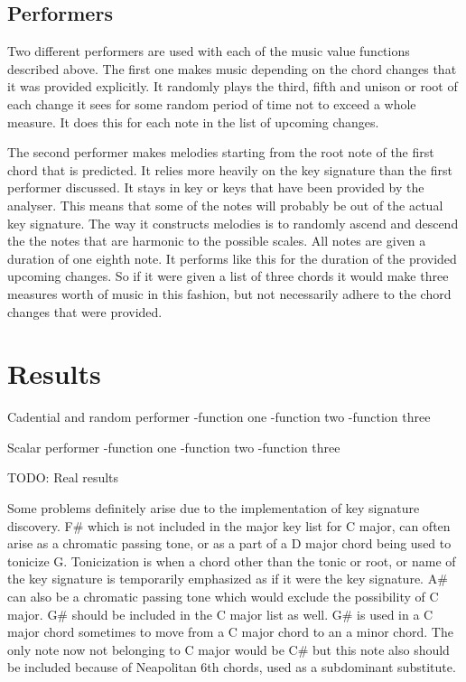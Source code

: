 \documentclass[12pt]{ucthesis}
\begin{document}
{\section{Performers}
\label {performers}

Two different performers are used with each of the music value functions described above. The first one makes music depending on the chord changes that it was provided explicitly. It randomly plays the third, fifth and unison or root of each change it sees for some random period of time not to exceed a whole measure. It does this for each note in the list of upcoming changes.

The second performer makes melodies starting from the root note of the first chord that is predicted. It relies more heavily on the key signature than the first performer discussed. It stays in key or keys that have been provided by the analyser. This means that some of the notes will probably be out of the actual key signature. The way it constructs melodies is to randomly ascend and descend the the notes that are harmonic to the possible scales. All notes are given a duration of one eighth note. It performs like this for the duration of the provided upcoming changes. So if it were given a list of three chords it would make three measures worth of music in this fashion, but not necessarily adhere to the chord changes that were provided.


\chapter{Results}
\label{results}

Cadential and random performer
-function one
-function two
-function three

Scalar performer
-function one
-function two
-function three

TODO: Real results

Some problems definitely arise due to the implementation of key signature discovery. F\# which is not included in the major key list for C major, can often arise as a chromatic passing tone, or as a part of a D major chord being used to tonicize G. Tonicization is when a chord other than the tonic or root, or name of the key signature is temporarily emphasized as if it were the key signature. A\# can also be a chromatic passing tone which would exclude the possibility of C major. G\# should be included in the C major list as well. G\# is used in a C major chord sometimes to move from a C major chord to an a minor chord. The only note now not belonging to C major would be C\# but this note also should be included because of Neapolitan 6th chords, used as a subdominant substitute.

}
\end{document}
